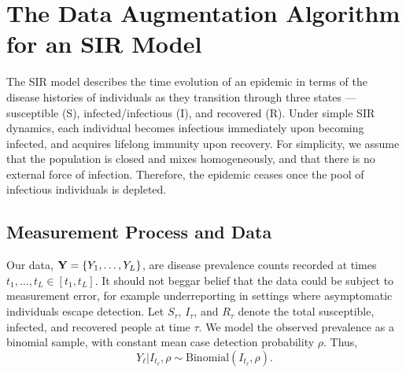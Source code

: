 \section{The Data Augmentation Algorithm for an SIR Model}
\label{sec:bda_sir_model}

The SIR model describes the time evolution of an epidemic in terms of the disease histories of individuals as they transition through three states --- susceptible (S), infected/infectious (I), and recovered (R). Under simple SIR dynamics, each individual becomes infectious immediately upon becoming infected, and acquires lifelong immunity upon recovery. For simplicity, we assume that the population is closed and mixes homogeneously, and that there is no external force of infection. Therefore, the epidemic ceases once the pool of infectious individuals is depleted.

\subsection{Measurement Process and Data}
\label{subsec:bda_meas_proc}
Our data, $\mathbf{Y} = \lbrace Y_{1}, \dots, Y_L \rbrace$, are disease prevalence counts recorded at times $t_1,\dots,t_L \in [t_1,t_L]$. It should not beggar belief that the data could be subject to measurement error, for example underreporting in settings where asymptomatic individuals escape detection. Let $ S_\tau $, $ I_\tau $, and $ R_\tau $ denote the total susceptible, infected, and recovered people at time $ \tau $. We model the observed prevalence as a binomial sample, with constant mean case detection probability $ \rho $. Thus,
\begin{equation}\label{eqn:bda_emit_dist}
Y_\ell | I_{t_\ell},\rho \sim \mathrm{Binomial}\left (I_{t_\ell}, \rho\right ).\end{equation}

